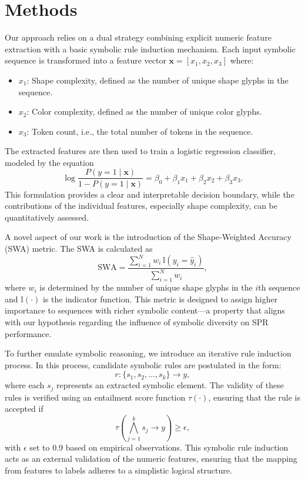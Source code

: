 \documentclass{article}
\begin{document}
\section{Methods}
Our approach relies on a dual strategy combining explicit numeric feature extraction with a basic symbolic rule induction mechanism. Each input symbolic sequence is transformed into a feature vector \(\mathbf{x} = [x_1, x_2, x_3]\) where:
\begin{itemize}
    \item \(x_1\): Shape complexity, defined as the number of unique shape glyphs in the sequence.
    \item \(x_2\): Color complexity, defined as the number of unique color glyphs.
    \item \(x_3\): Token count, i.e., the total number of tokens in the sequence.
\end{itemize}

The extracted features are then used to train a logistic regression classifier, modeled by the equation
\[
\log \frac{P(y=1\mid \mathbf{x})}{1-P(y=1\mid \mathbf{x})} = \beta_0 + \beta_1x_1 + \beta_2x_2 + \beta_3x_3.
\]
This formulation provides a clear and interpretable decision boundary, while the contributions of the individual features, especially shape complexity, can be quantitatively assessed.

A novel aspect of our work is the introduction of the Shape-Weighted Accuracy (SWA) metric. The SWA is calculated as 
\[
\text{SWA} = \frac{\sum_{i=1}^{N} w_i \, \mathbb{I}(y_i = \hat{y}_i)}{\sum_{i=1}^{N} w_i},
\]
where \(w_i\) is determined by the number of unique shape glyphs in the \(i\)th sequence and \(\mathbb{I}(\cdot)\) is the indicator function. This metric is designed to assign higher importance to sequences with richer symbolic content—a property that aligns with our hypothesis regarding the influence of symbolic diversity on SPR performance.

To further emulate symbolic reasoning, we introduce an iterative rule induction process. In this process, candidate symbolic rules are postulated in the form:
\[
r: \{s_1, s_2, \dots, s_k\} \rightarrow y,
\]
where each \(s_j\) represents an extracted symbolic element. The validity of these rules is verified using an entailment score function \(\tau(\cdot)\), ensuring that the rule is accepted if
\[
\tau\left(\bigwedge_{j=1}^{k}s_j \rightarrow y\right) \geq \epsilon,
\]
with \(\epsilon\) set to 0.9 based on empirical observations. This symbolic rule induction acts as an external validation of the numeric features, ensuring that the mapping from features to labels adheres to a simplistic logical structure.
\end{document}
